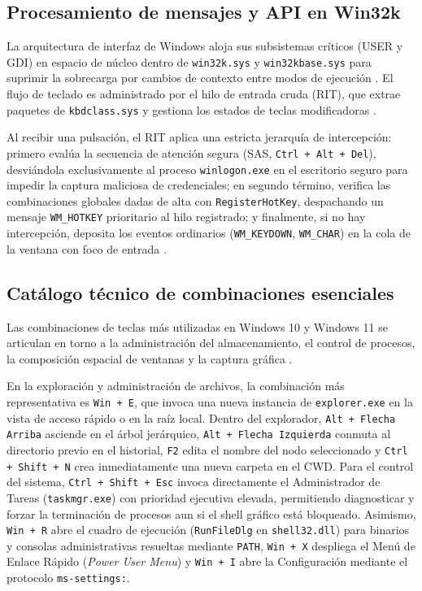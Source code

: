 \documentclass[12pt]{article}
\begin{document}
\subsection{Procesamiento de mensajes y API en Win32k}
\label{subsec:procesamientoWin32k}

La arquitectura de interfaz de Windows aloja sus subsistemas críticos (USER y GDI) en espacio de núcleo dentro de \texttt{win32k.sys} y \texttt{win32kbase.sys} para suprimir la sobrecarga por cambios de contexto entre modos de ejecución \parencite[\S 21.4, p.\ 1043]{deitel2004operating}. El flujo de teclado es administrado por el hilo de entrada cruda (RIT), que extrae paquetes de \texttt{kbdclass.sys} y gestiona los estados de teclas modificadoras \parencite{microsoftKeyboardInput}.

Al recibir una pulsación, el RIT aplica una estricta jerarquía de intercepción: primero evalúa la secuencia de atención segura (SAS, \texttt{Ctrl + Alt + Del}), desviándola exclusivamente al proceso \texttt{winlogon.exe} en el escritorio seguro para impedir la captura maliciosa de credenciales; en segundo término, verifica las combinaciones globales dadas de alta con \texttt{RegisterHotKey}, despachando un mensaje \texttt{WM\_HOTKEY} prioritario al hilo registrado; y finalmente, si no hay intercepción, deposita los eventos ordinarios (\texttt{WM\_KEYDOWN}, \texttt{WM\_CHAR}) en la cola de la ventana con foco de entrada \parencite{microsoftRegisterHotKey}.

\subsection{Catálogo técnico de combinaciones esenciales}
\label{subsec:catalogoAtajosWindows}

Las combinaciones de teclas más utilizadas en Windows 10 y Windows 11 se articulan en torno a la administración del almacenamiento, el control de procesos, la composición espacial de ventanas y la captura gráfica \parencite{microsoftShortcutsWindows}.

En la exploración y administración de archivos, la combinación más representativa es \texttt{Win + E}, que invoca una nueva instancia de \texttt{explorer.exe} en la vista de acceso rápido o en la raíz local. Dentro del explorador, \texttt{Alt + Flecha Arriba} asciende en el árbol jerárquico, \texttt{Alt + Flecha Izquierda} conmuta al directorio previo en el historial, \texttt{F2} edita el nombre del nodo seleccionado y \texttt{Ctrl + Shift + N} crea inmediatamente una nueva carpeta en el CWD. Para el control del sistema, \texttt{Ctrl + Shift + Esc} invoca directamente el Administrador de Tareas (\texttt{taskmgr.exe}) con prioridad ejecutiva elevada, permitiendo diagnosticar y forzar la terminación de procesos aun si el shell gráfico está bloqueado. Asimismo, \texttt{Win + R} abre el cuadro de ejecución (\texttt{RunFileDlg} en \texttt{shell32.dll}) para binarios y consolas administrativas resueltas mediante \texttt{PATH}, \texttt{Win + X} despliega el Menú de Enlace Rápido (\textit{Power User Menu}) y \texttt{Win + I} abre la Configuración mediante el protocolo \texttt{ms-settings:}.
\end{document}
